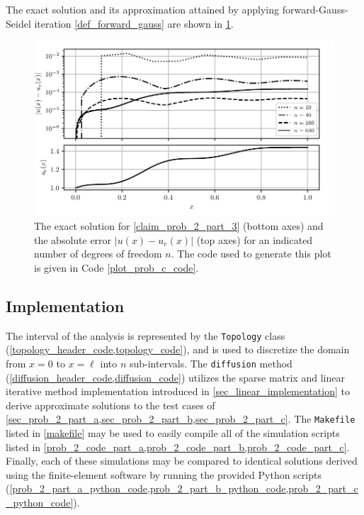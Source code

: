 \documentclass[12pt]{evanarticle}
\begin{document}
The exact solution and its approximation attained by applying forward-Gauss-Seidel iteration \cref{def_forward_gauss} are shown in \cref{fig_prob_2_part_c}.

\begin{figure}
	\centering
		\includegraphics[width=1.0\linewidth]{../images/prob_2_part_c.pdf}
	\caption{The exact solution for \cref{claim_prob_2_part_3} (bottom axes) and the absolute error $| u(x) - u_e(x) |$ (top axes) for an indicated number of degrees of freedom $n$.
	The code used to generate this plot is given in Code \cref{plot_prob_c_code}.}
	\label{fig_prob_2_part_c}
\end{figure}

\newpage

\subsection{Implementation}

The interval of the analysis is represented by the \texttt{Topology} class (\cref{topology_header_code,topology_code}), and is used to discretize the domain from $x = 0$ to $x = \ell$ into $n$ sub-intervals.
The \texttt{diffusion} method (\cref{diffusion_header_code,diffusion_code}) utilizes the sparse matrix and linear iterative method implementation introduced in \cref{sec_linear_implementation} to derive approximate solutions to the test cases of \cref{sec_prob_2_part_a,sec_prob_2_part_b,sec_prob_2_part_c}.
The \texttt{Makefile} listed in \cref{makefile} may be used to easily compile all of the simulation scripts listed in \cref{prob_2_code_part_a,prob_2_code_part_b,prob_2_code_part_c}.
Finally, each of these simulations may be compared to identical solutions derived using the finite-element software \fenics by running the provided Python scripts (\cref{prob_2_part_a_python_code,prob_2_part_b_python_code,prob_2_part_c_python_code}).
\end{document}
